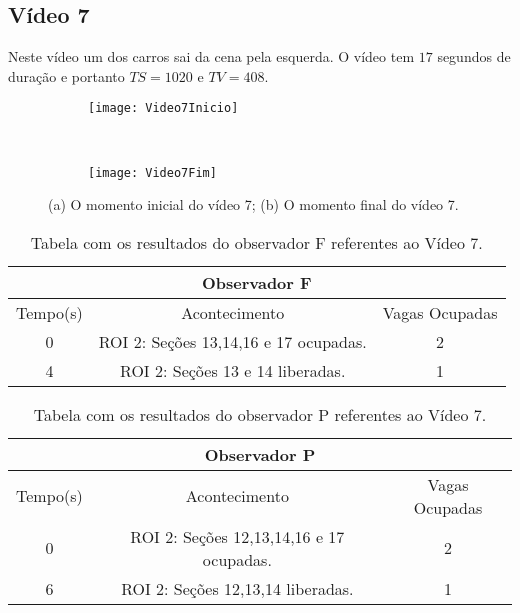 \subsection{Vídeo 7}

Neste vídeo um dos carros sai da cena pela esquerda. O vídeo tem $17$ segundos de duração e portanto $TS = 1020$ e $TV = 408$.

\begin{figure}[H]
\centering
\begin{subfigure}{.5\textwidth}
\centering
\texttt{[image: Video7Inicio]}
\caption{}
\end{subfigure}\
\begin{subfigure}{.5\textwidth}
\centering
\texttt{[image: Video7Fim]}
\caption{}
\end{subfigure}
\centering
\caption{(a) O momento inicial do vídeo 7; (b) O momento final do vídeo 7.}%
\label{}%
\end{figure}

\begin{table}[H]
\begin{center}
\begin{tabular}{|c||c||c|}
\hline
\multicolumn{3}{|c|}{Observador F}  \\ \hline \hline
Tempo(s) & Acontecimento & Vagas Ocupadas \\ \hline
0 & ROI 2: Seções 13,14,16 e 17 ocupadas. & 2 \\ \hline
4 & ROI 2: Seções 13 e 14 liberadas. & 1 \\
\hline
\end{tabular}
\end{center}
\caption{Tabela com os resultados do observador F referentes ao Vídeo 7.}
\label{tab:video7F}
\end{table}

\begin{table}[H]
\begin{center}
\begin{tabular}{|c||c||c|}
\hline
\multicolumn{3}{|c|}{Observador P}  \\ \hline \hline
Tempo(s) & Acontecimento & Vagas Ocupadas \\ \hline
0 & ROI 2: Seções 12,13,14,16 e 17 ocupadas. & 2 \\ \hline
6 & ROI 2: Seções 12,13,14 liberadas. & 1 \\ 
\hline
\end{tabular}
\end{center}
\caption{Tabela com os resultados do observador P referentes ao Vídeo 7.}
\label{tab:video7P}
\end{table}


